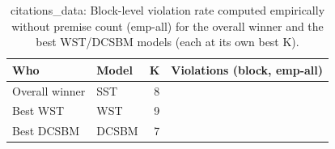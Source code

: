 \begin{table}[!h]
\centering
\caption{citations_data: Block-level violation rate computed empirically without premise count (emp-all) for the overall winner and the best WST/DCSBM models (each at its own best K).\\\label{tab:app-citations_data-best-block-empall}}
\centering
\begin{tabular}[t]{llrr}
\toprule
Who & Model & K & Violations (block, emp-all)\\
\midrule
Overall winner & SST & 8 & \\
Best WST & WST & 9 & \\
Best DCSBM & DCSBM & 7 & \\
\bottomrule
\end{tabular}
\end{table}

